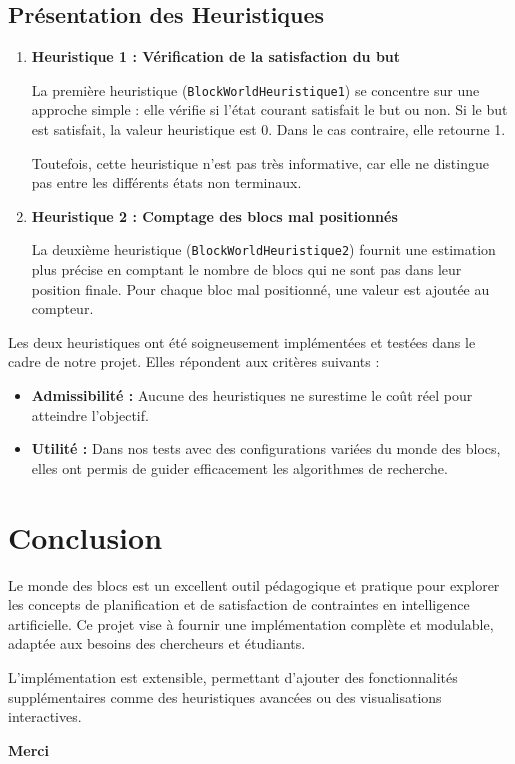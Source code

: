 \documentclass[a4paper,12pt]{article} %
\begin{document}
\subsection{Présentation des Heuristiques}
\begin{enumerate}
    \item \textbf{Heuristique 1 : Vérification de la satisfaction du but}

    La première heuristique (\texttt{BlockWorldHeuristique1}) se concentre sur une approche simple : elle vérifie si l'état courant satisfait le but ou non. Si le but est satisfait, la valeur heuristique est 0. Dans le cas contraire, elle retourne 1. 

    Toutefois, cette heuristique n'est pas très informative, car elle ne distingue pas entre les différents états non terminaux.

    \item \textbf{Heuristique 2 : Comptage des blocs mal positionnés}

    La deuxième heuristique (\texttt{BlockWorldHeuristique2}) fournit une estimation plus précise en comptant le nombre de blocs qui ne sont pas dans leur position finale. Pour chaque bloc mal positionné, une valeur est ajoutée au compteur.
\end{enumerate}
Les deux heuristiques ont été soigneusement implémentées et testées dans le cadre de notre projet. Elles répondent aux critères suivants :
\begin{itemize}
    \item \textbf{Admissibilité :} Aucune des heuristiques ne surestime le coût réel pour atteindre l'objectif.
    \item \textbf{Utilité :} Dans nos tests avec des configurations variées du monde des blocs, elles ont permis de guider efficacement les algorithmes de recherche.
\end{itemize}

\section{Conclusion}
Le monde des blocs est un excellent outil pédagogique et pratique pour explorer les concepts de planification et de satisfaction de contraintes en intelligence artificielle. Ce projet vise à fournir une implémentation complète et modulable, adaptée aux besoins des chercheurs et étudiants.

L'implémentation est extensible, permettant d'ajouter des fonctionnalités supplémentaires comme des heuristiques avancées ou des visualisations interactives.

\vspace{2cm}
\begin{center}
    \textbf{Merci}
\end{center}
\end{document}
